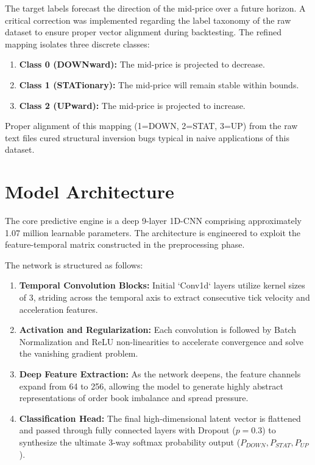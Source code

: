\documentclass[journal]{IEEEtran}
\begin{document}
The target labels forecast the direction of the mid-price over a future horizon. A critical correction was implemented regarding the label taxonomy of the raw dataset to ensure proper vector alignment during backtesting. The refined mapping isolates three discrete classes:
\begin{enumerate}
    \item \textbf{Class 0 (DOWNward):} The mid-price is projected to decrease.
    \item \textbf{Class 1 (STATionary):} The mid-price will remain stable within bounds.
    \item \textbf{Class 2 (UPward):} The mid-price is projected to increase.
\end{enumerate}
Proper alignment of this mapping (1=DOWN, 2=STAT, 3=UP) from the raw text files cured structural inversion bugs typical in naive applications of this dataset.

\section{Model Architecture}
The core predictive engine is a deep 9-layer 1D-CNN comprising approximately 1.07 million learnable parameters. The architecture is engineered to exploit the feature-temporal matrix constructed in the preprocessing phase.

The network is structured as follows:
\begin{enumerate}
    \item \textbf{Temporal Convolution Blocks:} Initial `Conv1d` layers utilize kernel sizes of 3, striding across the temporal axis to extract consecutive tick velocity and acceleration features. 
    \item \textbf{Activation and Regularization:} Each convolution is followed by Batch Normalization and ReLU non-linearities to accelerate convergence and solve the vanishing gradient problem.
    \item \textbf{Deep Feature Extraction:} As the network deepens, the feature channels expand from 64 to 256, allowing the model to generate highly abstract representations of order book imbalance and spread pressure.
    \item \textbf{Classification Head:} The final high-dimensional latent vector is flattened and passed through fully connected layers with Dropout ($p=0.3$) to synthesize the ultimate 3-way softmax probability output ($P_{DOWN}, P_{STAT}, P_{UP}$).
\end{enumerate}
\end{document}
